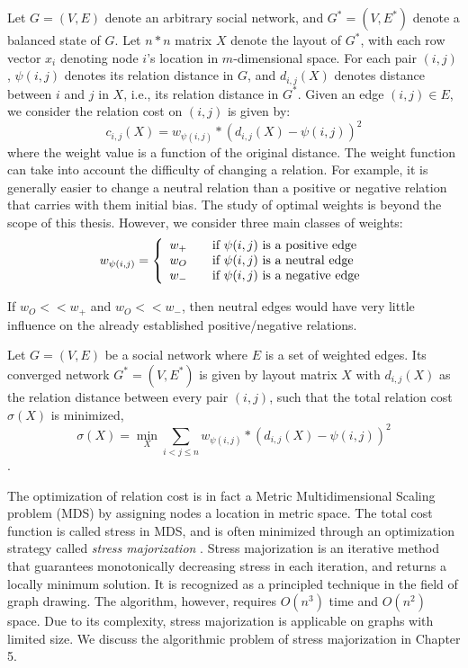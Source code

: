 Let $G=(V,E)$ denote an arbitrary social network, and $G^{*}=(V,
E^{*})$ denote a balanced state of $G$. Let $n*n$ matrix $X$ denote
the layout of $G^{*}$, with each row vector $x_{i}$ denoting node
$i$'s location in $m$-dimensional space. For each pair $(i,j)$,
$\psi(i,j)$ denotes its relation distance in $G$, and $d_{i,j}(X)$
denotes distance between $i$ and $j$ in $X$, i.e., its relation
distance in $G^{*}$.  Given an edge $(i,j)\in E$, we consider the
relation cost on $(i,j)$ is given by:
\[c_{i, j}(X)=w_{\psi(i,j)}*(d_{i,j}(X)-\psi{(i,j)})^2\]
where the weight value is a function of the original distance. The
weight function can take into account the difficulty of changing a
relation. For example, it is generally easier to change a neutral
relation than a positive or negative relation that carries with them
initial bias. The study of optimal weights is beyond the scope of this
thesis. However, we consider three main classes of weights:
\[
 w_{\psi(i,j)}= \left\{ 
  \begin{array}{l l}
    w_{+} & \quad \text{if $\psi(i,j)$ is a positive edge}\\
    w_{O} & \quad \text{if $\psi(i,j)$ is a neutral edge}\\
    w_{-} & \quad \text{if $\psi(i,j)$ is a negative edge}\\
  \end{array} \right.
\]

If $w_{O} << w_{+}$ and $w_{O} << w_{-}$, then neutral edges would
have very little influence on the already established
positive/negative relations.

\begin{definition}
Let $G=(V,E)$ be a social network where $E$ is a set of weighted
edges. Its converged network $G^{*}=(V,E^{*})$ is given by layout
matrix $X$ with $d_{i,j}(X)$ as the relation distance between every
pair $(i,j)$, such that the total relation cost $\sigma(X)$ is
minimized,
\[\sigma(X)= \min_{X} \sum_{i<j \leq n}w_{\psi(i,j)}*(d_{i,j}(X)-\psi{(i,j)})^2\].

\end{definition}
The optimization of relation cost is in fact a Metric
Multidimensional Scaling problem (MDS) by assigning nodes a location
in metric space. The total cost function is called stress in MDS, and
is often minimized through an optimization strategy called {\it stress
  majorization} \cite {Gansner:05}. Stress majorization is an iterative
method that guarantees monotonically decreasing stress in each
iteration, and returns a locally minimum solution.  It is recognized
as a principled technique in the field of graph drawing. The
algorithm, however, requires $O(n^3)$ time and $O(n^{2})$ space. Due
to its complexity, stress majorization is applicable on graphs with
limited size. We discuss the algorithmic problem of stress majorization in Chapter 5.

